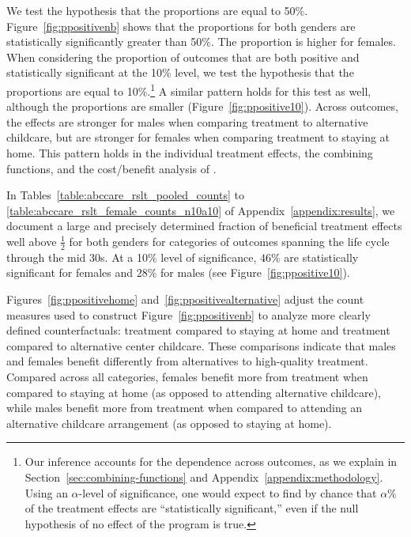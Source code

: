 We test the hypothesis that the proportions are equal to 50\%. Figure~\ref{fig:ppositivenb} shows that the proportions for both genders are statistically significantly greater than 50\%. The proportion is higher for females. When considering the proportion of outcomes that are both positive and statistically significant at the 10\% level, we test the hypothesis that the proportions are equal to 10\%.\footnote{Our inference accounts for the dependence across outcomes, as we explain in Section~\ref{sec:combining-functions} and Appendix~\ref{appendix:methodology}. Using an $\alpha$-level of significance, one would expect to find by chance that $\alpha\%$ of the treatment effects are ``statistically significant,'' even if the null hypothesis of no effect of the program is true.} A similar pattern holds for this test as well, although the proportions are smaller (Figure~\ref{fig:ppositive10}). Across outcomes, the effects are stronger for males when comparing treatment to alternative childcare, but are stronger for females when comparing treatment to staying at home. This pattern holds in the individual treatment effects, the combining functions, and the cost/benefit analysis of \citet{Garcia_Heckman_Leaf_etal_2017_Comp_CBA_Unpublished}.

In Tables~\ref{table:abccare_rslt_pooled_counts} to \ref{table:abccare_rslt_female_counts_n10a10} of Appendix~\ref{appendix:results}, we document a large and precisely determined fraction of beneficial treatment effects well above $\frac{1}{2}$ for both genders for categories of outcomes spanning the life cycle through the mid 30s. At a 10\% level of significance, $46\%$ are statistically significant for females and $28\%$ for males (see Figure~\ref{fig:ppositive10}).

Figures~\ref{fig:ppositivehome} and~\ref{fig:ppositivealternative} adjust the count measures used to construct Figure~\ref{fig:ppositivenb} to analyze more clearly defined counterfactuals: treatment compared to staying at home and treatment compared to alternative center childcare. These comparisons indicate that males and females benefit differently from alternatives to high-quality treatment. Compared across all categories, females benefit more from treatment when compared to staying at home (as opposed to attending alternative childcare), while males benefit more from treatment when compared to attending an alternative childcare arrangement (as opposed to staying at home).

